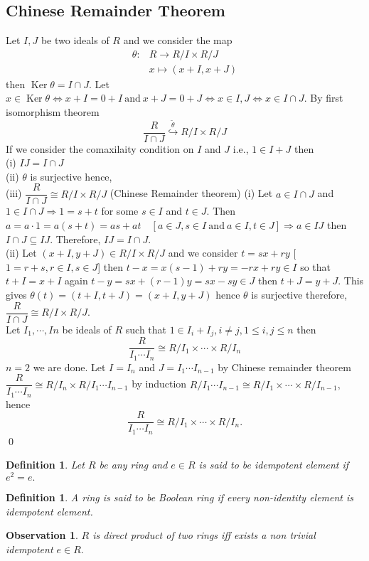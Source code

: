 \documentclass[11pt]{amsart}
\newtheorem{definition}[theorem]{Definition}%
\newtheorem{obs}[theorem]{Observation}
\begin{document}
\subsection{Chinese Remainder Theorem}
Let $I,J$ be two ideals of $R$ and we consider the map \begin{align*}
\theta:&R\to R/I\times R/J\\
&x\mapsto (x+I,x+J)
\end{align*}
then $\operatorname{Ker}\theta=I\cap J.$ Let $x\in \operatorname{Ker}\theta\Leftrightarrow x+I=0+I~\text{and}~x+J=0+J\Leftrightarrow x\in I,J\Leftrightarrow x\in I\cap J.$ By first isomorphism theorem $$\dfrac{R}{I\cap J} \stackrel{\tilde{\theta} }{\hookrightarrow} R/I\times R/J$$
If we consider the comaxilaity condition on $I$ and $J$ i.e., $1\in I+J$ then \\
(i) $IJ=I\cap J$\\
(ii) $\theta$ is surjective hence, \\
(iii) $\dfrac{R}{I\cap J}\cong R/I\times R/J$ (Chinese Remainder theorem)
\proof (i) Let $a\in I\cap J$ and $1\in I\cap J \Rightarrow 1=s+t$ for some $s\in I$ and $t\in J.$ Then $a=a\cdot 1=a(s+t)=as+at \quad[a\in J,s\in I~\text{and}~a\in I,t\in J] \Rightarrow a\in IJ$
then $I\cap J\subseteq IJ.$ Therefore, $IJ=I\cap J.$ \\
(ii) Let $(x+I,y+J)\in R/I\times R/J$ and we consider $t=sx+ry$ [$1=r+s,r\in I,s\in J$] then $t-x=x(s-1)+ry=-rx+ry\in I$ so that $t+I=x+I$ again $t-y=sx+(r-1)y=sx-sy\in J$ then $t+J=y+J.$ This gives $\theta(t)=(t+I,t+J)=(x+I,y+J)$ hence $\theta$ is surjective therefore, $\dfrac{R}{I\cap J}\cong R/I\times R/J.$\\
Let $I_1,\cdots ,In$ be ideals of $R$ such that $1\in I_i+I_j,i\neq j,1\leq i,j\leq n$ then $$\dfrac{R}{I_1\cdots I_n}\cong R/I_1\times \cdots \times R/I_n$$
\proof $n=2$ we are done. Let $I=I_n$ and $J=I_1\cdots I_{n-1}$ by Chinese remainder theorem $\dfrac{R}{I_1\cdots I_n}\cong R/I_n\times R/I_1\cdots I_{n-1}$ by induction $R/I_1\cdots I_{n-1}\cong R/I_1\times \cdots \times R/I_{n-1},$ hence $$\dfrac{R}{I_1\cdots I_n}\cong R/I_1\times \cdots \times R/I_n.$$ \qed
\begin{definition}
Let $R$ be any ring and $e\in R$ is said to be idempotent element if $e^2=e.$
\end{definition}
\begin{definition}
A ring is said to be Boolean ring if every non-identity element is idempotent element.
\end{definition}
\begin{obs}
$R$ is direct product of two rings iff exists a non trivial idempotent $e\in R.$
\end{obs}
\end{document}
